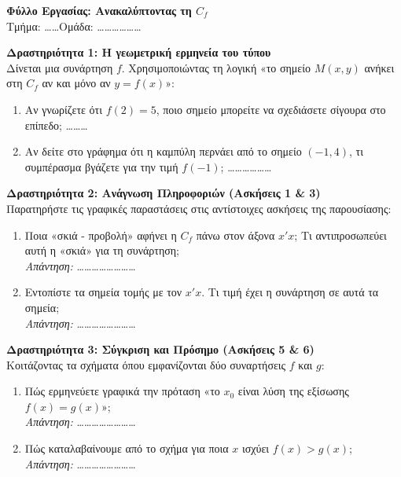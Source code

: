 \documentclass[a4paper, 12pt]{article}
\begin{document}
\newpage

\begin{center}
  \Large \textbf{Φύλλο Εργασίας: Ανακαλύπτοντας τη $C_f$} \\
  \small Τμήμα: \dots\dots \quad Ομάδα: \dots\dots\dots\dots\dots\dots
\end{center}

\vspace{0.5cm}

\textbf{Δραστηριότητα 1: Η γεωμετρική ερμηνεία του τύπου} \\
Δίνεται μια συνάρτηση $f$. Χρησιμοποιώντας τη λογική «το σημείο $M(x,y)$ ανήκει στη $C_f$ αν και μόνο αν $y=f(x)$»:
\begin{enumerate}
  \item Αν γνωρίζετε ότι $f(2)=5$, ποιο σημείο μπορείτε να σχεδιάσετε σίγουρα στο επίπεδο; \dots\dots\dots
  \item Αν δείτε στο γράφημα ότι η καμπύλη περνάει από το σημείο $(-1, 4)$, τι συμπέρασμα βγάζετε για την τιμή $f(-1)$; \dots\dots\dots\dots\dots\dots
\end{enumerate}

\vspace{0.8cm}

\textbf{Δραστηριότητα 2: Ανάγνωση Πληροφοριών (Ασκήσεις 1 \& 3)} \\
Παρατηρήστε τις γραφικές παραστάσεις στις αντίστοιχες ασκήσεις της παρουσίασης:
\begin{enumerate}
  \item Ποια «σκιά - προβολή» αφήνει η $C_f$ πάνω στον άξονα $x'x$; Τι αντιπροσωπεύει αυτή η «σκιά» για τη συνάρτηση; \\
        \textit{Απάντηση:} \dots\dots\dots\dots\dots\dots\dots\dots
  \item Εντοπίστε τα σημεία τομής με τον $x'x$. Τι τιμή έχει η συνάρτηση σε αυτά τα σημεία; \\
        \textit{Απάντηση:} \dots\dots\dots\dots\dots\dots\dots\dots
\end{enumerate}

\vspace{0.8cm}

\textbf{Δραστηριότητα 3: Σύγκριση και Πρόσημο (Ασκήσεις 5 \& 6)} \\
Κοιτάζοντας τα σχήματα όπου εμφανίζονται δύο συναρτήσεις $f$ και $g$:
\begin{enumerate}
  \item Πώς ερμηνεύετε γραφικά την πρόταση «το $x_0$ είναι λύση της εξίσωσης $f(x)=g(x)$»; \\
        \textit{Απάντηση:} \dots\dots\dots\dots\dots\dots\dots\dots
  \item Πώς καταλαβαίνουμε από το σχήμα για ποια $x$ ισχύει $f(x) > g(x)$; \\
        \textit{Απάντηση:} \dots\dots\dots\dots\dots\dots\dots\dots
\end{enumerate}
\end{document}
